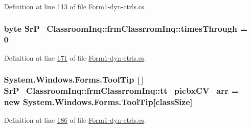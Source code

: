 \-Definition at line \hyperlink{_form1-dyn-ctrls_8cs_source_l00113}{113} of file \hyperlink{_form1-dyn-ctrls_8cs_source}{\-Form1-\/dyn-\/ctrls.\-cs}.

\hypertarget{class_sr_p___classroom_inq_1_1frm_classrrom_inq_ab730336bf81938256d6f20922c15484b}{
\subsubsection[{times\-Through}]{\setlength{\rightskip}{0pt plus 5cm}byte {\bf \-Sr\-P\-\_\-\-Classroom\-Inq\-::frm\-Classrrom\-Inq\-::times\-Through} = 0}}
\label{class_sr_p___classroom_inq_1_1frm_classrrom_inq_ab730336bf81938256d6f20922c15484b}


\-Definition at line \hyperlink{_form1-dyn-ctrls_8cs_source_l00171}{171} of file \hyperlink{_form1-dyn-ctrls_8cs_source}{\-Form1-\/dyn-\/ctrls.\-cs}.

\hypertarget{class_sr_p___classroom_inq_1_1frm_classrrom_inq_a2b443a71216ac1b9a63f9db496161a4d}{
\subsubsection[{tt\-\_\-picbx\-C\-V\-\_\-arr}]{\setlength{\rightskip}{0pt plus 5cm}\-System.\-Windows.\-Forms.\-Tool\-Tip \mbox{[}$\,$\mbox{]} {\bf \-Sr\-P\-\_\-\-Classroom\-Inq\-::frm\-Classrrom\-Inq\-::tt\-\_\-picbx\-C\-V\-\_\-arr} = new \-System.\-Windows.\-Forms.\-Tool\-Tip\mbox{[}{\bf class\-Size}\mbox{]}}}
\label{class_sr_p___classroom_inq_1_1frm_classrrom_inq_a2b443a71216ac1b9a63f9db496161a4d}


\-Definition at line \hyperlink{_form1-dyn-ctrls_8cs_source_l00186}{186} of file \hyperlink{_form1-dyn-ctrls_8cs_source}{\-Form1-\/dyn-\/ctrls.\-cs}.

